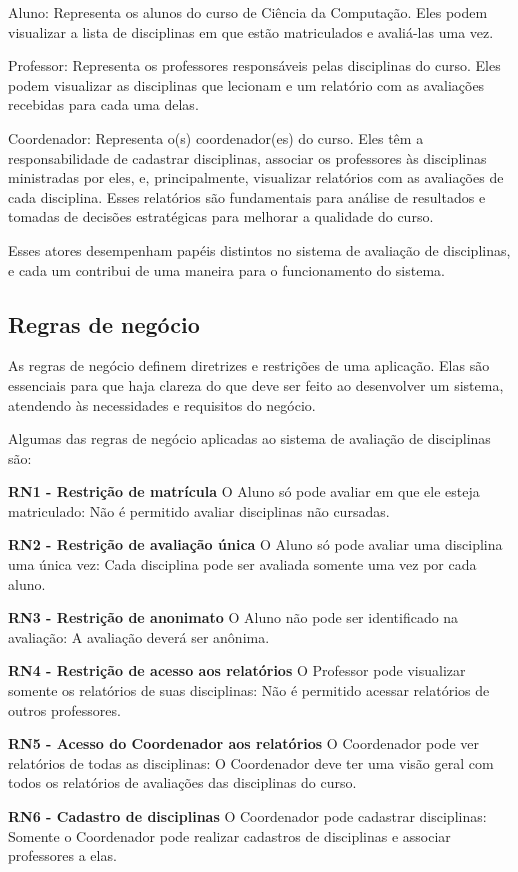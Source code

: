 \begin{alineas}
  \item Aluno: Representa os alunos do curso de Ciência da Computação. Eles podem visualizar a lista de disciplinas em que estão matriculados e avaliá-las uma vez.
  \item Professor: Representa os professores responsáveis pelas disciplinas do curso. Eles podem visualizar as disciplinas que lecionam e um relatório com as avaliações recebidas para cada uma delas.
  \item Coordenador: Representa o(s) coordenador(es) do curso. Eles têm a responsabilidade de cadastrar disciplinas, associar os professores às disciplinas ministradas por eles, e, principalmente, visualizar relatórios com as avaliações de cada disciplina. Esses relatórios são fundamentais para análise de resultados e tomadas de decisões estratégicas para melhorar a qualidade do curso.
\end{alineas}

Esses atores desempenham papéis distintos no sistema de avaliação de disciplinas, e cada um contribui de uma maneira para o funcionamento do sistema.

\subsection{Regras de negócio}
As regras de negócio definem diretrizes e restrições de uma aplicação. Elas são essenciais para que haja clareza do que deve ser feito ao desenvolver um sistema, atendendo às necessidades e requisitos do negócio.

Algumas das regras de negócio aplicadas ao sistema de avaliação de disciplinas são:

\begin{alineas}
  \item \textbf{RN1 - Restrição de matrícula} O Aluno só pode avaliar em que ele esteja matriculado: Não é permitido avaliar disciplinas não cursadas.
  \item \textbf{RN2 - Restrição de avaliação única} O Aluno só pode avaliar uma disciplina uma única vez: Cada disciplina pode ser avaliada somente uma vez por cada aluno.
  \item \textbf{RN3 - Restrição de anonimato} O Aluno não pode ser identificado na avaliação: A avaliação deverá ser anônima.
  \item \textbf{RN4 - Restrição de acesso aos relatórios} O Professor pode visualizar somente os relatórios de suas disciplinas: Não é permitido acessar relatórios de outros professores.
  \item \textbf{RN5 - Acesso do Coordenador aos relatórios} O Coordenador pode ver relatórios de todas as disciplinas: O Coordenador deve ter uma visão geral com todos os relatórios de avaliações das disciplinas do curso.
  \item \textbf{RN6 - Cadastro de disciplinas} O Coordenador pode cadastrar disciplinas: Somente o Coordenador pode realizar cadastros de disciplinas e associar professores a elas.
\end{alineas}

